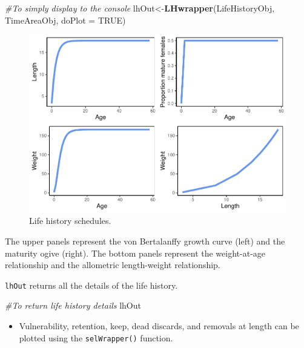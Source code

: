 \documentclass[
]{book}
\newenvironment{Shaded}{\begin{snugshade}}{\end{snugshade}}
\newcommand{\AttributeTok}[1]{\textcolor[rgb]{0.13,0.29,0.53}{#1}}
\newcommand{\CommentTok}[1]{\textcolor[rgb]{0.56,0.35,0.01}{\textit{#1}}}
\newcommand{\ConstantTok}[1]{\textcolor[rgb]{0.56,0.35,0.01}{#1}}
\newcommand{\FunctionTok}[1]{\textcolor[rgb]{0.13,0.29,0.53}{\textbf{#1}}}
\newcommand{\NormalTok}[1]{#1}
\newcommand{\OtherTok}[1]{\textcolor[rgb]{0.56,0.35,0.01}{#1}}
\providecommand{\tightlist}{%
  \setlength{\itemsep}{0pt}\setlength{\parskip}{0pt}}
\begin{document}
\begin{Shaded}
\begin{Highlighting}[]
\CommentTok{\#To simply display to the console}
\NormalTok{lhOut}\OtherTok{\textless{}{-}}\FunctionTok{LHwrapper}\NormalTok{(LifeHistoryObj, TimeAreaObj, }\AttributeTok{doPlot =} \ConstantTok{TRUE}\NormalTok{)}
\end{Highlighting}
\end{Shaded}

\begin{figure}
\centering
\includegraphics{_main_files/figure-latex/lifehist-1.pdf}
\caption{\label{fig:lifehist}Life history schedules.}
\end{figure}

The upper panels represent the von Bertalanffy growth curve (left) and the maturity ogive (right). The bottom panels represent the weight-at-age relationship and the allometric length-weight relationship.

\texttt{lhOut} returns all the details of the life history.

\begin{Shaded}
\begin{Highlighting}[]
\CommentTok{\#To return life history details}
\NormalTok{lhOut}
\end{Highlighting}
\end{Shaded}

\begin{itemize}
\tightlist
\item
  Vulnerability, retention, keep, dead discards, and removals at length can be plotted using the \texttt{selWrapper()} function.
\end{itemize}
\end{document}
